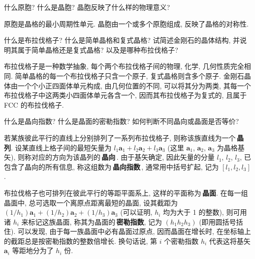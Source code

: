 \documentclass[UTF8]{ctexart}
\newenvironment{Answer}{}{}
\begin{document}
\begin{Question}
            \item 什么原胞? 什么是晶胞? 晶胞反映了什么样的物理意义?

\begin{Answer}
    \begin{Solve}[Answer:]
        \hspace*{2em}原胞是晶格的最小周期性单元. 晶胞由一个或多个原胞组成, 反映了晶格的对称性.
    \end{Solve}
\end{Answer}

            \item 什么是布拉伐格子? 什么是简单晶格和复式晶格? 试简述金刚石的晶体结构, 并说明其属于简单晶格还是复式晶格? 以及是哪种布拉伐格子?

\begin{Answer}
    \begin{Solve}[Answer:]
        布拉伐格子是一种数学抽象, 每个两个布拉伐格子间的物理, 化学, 几何性质完全相同. 简单晶格的每一个布拉伐格子只含一个原子, 复式晶格则含多个原子. 金刚石晶体由一个个小正四面体单元构成, 由几何位置的不同, 可以将其分为两类, 其每一个布拉伐格子中这两类小四面体单元各含一个, 因而其布拉伐格子为复式的, 且属于 FCC 的布拉伐格子.
    \end{Solve}
\end{Answer}

            \item 什么是晶向指数? 什么是晶面的密勒指数? 如何判断不同晶向或晶面是否等价?

\begin{Answer}
    \begin{Solve}[Answer:]
        \hspace*{2em}若某族彼此平行的直线上分别排列了一系列布拉伐格子, 则称该族直线为一个\,\textbf{晶列}. 设某直线上格子间的最短矢量为 $l_1 \bm{a}_1 + l_2 \bm{a}_2 + l_3 \bm{a}_3$ (这里 $\bm{a}_1$, $\bm{a}_2$, $\bm{a}_3$ 为晶格基矢), 则称对应的方向为该晶列的\,\textbf{晶向}\,. 由于基矢确定, 因此矢量的分量 $l_1$, $l_2$, $l_3$, 已包含了晶向的所有信息, 称这组数为\,\textbf{晶向指数}\,, 通常用中括号扩起, 记为 $[l_1, l_2, l_3]$.

        \hspace*{2em}布拉伐格子也可排列在彼此平行的等距平面系上, 这样的平面称为\,\textbf{晶面}. 在每一组晶面中, 总可选取一个离原点距离最短的晶面, 设其截距为 $(1 / h_1) \bm{a}_1 + (1 / h_2) \bm{a}_2 + (1 / h_3) \bm{a}_3$ (可以证明, $h_i$ 均为大于 1 的整数), 则可用诸 $h_i$ 来标记这族晶面, 称其为晶面的\,\textbf{密勒指数}, 记为 $(h_1 h_2 h_3)$ (即用圆括号括住). 可以发现, 由于每一族晶面中必有晶面过原点, 因而晶面在增长时, 在坐标轴上的截距总是按密勒指数的整数倍增长. 换句话说, 第 $i$ 个密勒指数 $h_i$ 代表这将基矢 $\bm{a}_i$ 等距地分为了 $h_i$ 份.


\end{Solve}
\end{Answer}
\end{Question}
\end{document}
